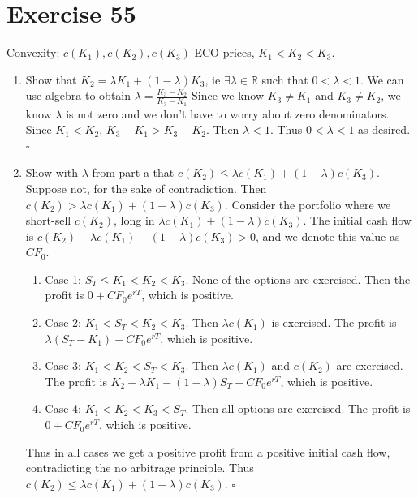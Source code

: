 \documentclass{article}
\begin{document}
\section*{Exercise 55}
Convexity: $c(K_1), c(K_2), c(K_3)$ ECO prices, $K_1 < K_2 < K_3$.
\begin{enumerate}
    \item Show that $K_2 = \lambda K_1 + (1 - \lambda) K_3$, ie $\exists \lambda \in \mathbb{R}$ such that $0 < \lambda < 1$. We can use algebra to obtain $\lambda = \frac{K_3 - K_2}{K_3 - K_1}$
        Since we know $K_3 \neq K_1$ and $K_3 \neq K_2$, we know $\lambda$ is not zero and we don't have to worry about zero denominators. Since $K_1 < K_2$, $K_3 - K_1 > K_3 - K_2$. Then $\lambda < 1$. Thus $0 < \lambda < 1$ as desired. $\square$
    \item Show with $\lambda$ from part a that $c(K_2) \leq \lambda c(K_1) + (1-\lambda)c(K_3)$. Suppose not, for the sake of contradiction. Then $c(K_2) > \lambda c(K_1) + (1-\lambda)c(K_3)$.
        Consider the portfolio where we short-sell $c(K_2)$, long in $\lambda c(K_1) + (1-\lambda)c(K_3)$. The initial cash flow is $c(K_2) - \lambda c(K_1) - (1 - \lambda)c(K_3) > 0$, and we denote this value as $CF_0$.
        \begin{enumerate}
            \item Case 1: $S_T \leq K_1 < K_2 < K_3$. None of the options are exercised. Then the profit is $0 + CF_0e^{rT}$, which is positive.
            \item Case 2: $K_1 < S_T < K_2 < K_3$. Then $\lambda c(K_1)$ is exercised. The profit is $\lambda (S_T - K_1) + CF_0e^{rT}$, which is positive.
            \item Case 3: $K_1 < K_2 < S_T < K_3$. Then $\lambda c(K_1)$ and $c(K_2)$ are exercised. The profit is $K_2 - \lambda K_1 - (1 - \lambda)S_T + CF_0e^{rT}$, which is positive.
            \item Case 4: $K_1 < K_2 < K_3 < S_T$. Then all options are exercised. The profit is $0 + CF_0e^{rT}$, which is positive.
        \end{enumerate}
        Thus in all cases we get a positive profit from a positive initial cash flow, contradicting the no arbitrage principle. Thus $c(K_2) \leq \lambda c(K_1) + (1-\lambda)c(K_3)$. $\square$
\end{enumerate}
\end{document}
